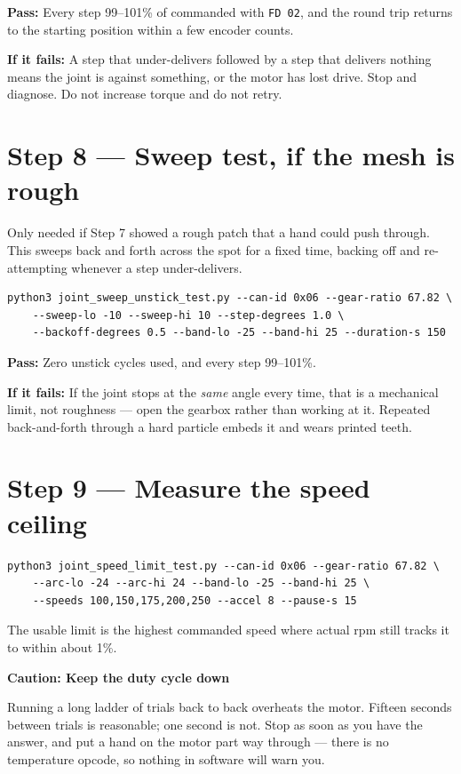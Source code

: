 \documentclass[11pt,letterpaper]{article}
\newenvironment{caution}[1]{%
    \par\addvspace{8pt}%
    \noindent{\color{cautionred}\rule{\linewidth}{0.8pt}}\par\vspace{2pt}
    \noindent\textbf{\color{cautionred}Caution: #1}\par\vspace{2pt}
}{%
    \par\vspace{2pt}\noindent{\color{cautionred}\rule{\linewidth}{0.4pt}}%
    \par\addvspace{8pt}%
}
\newcommand{\passif}[1]{\par\vspace{2pt}\noindent\textbf{\color{okgreen}Pass:} #1\par\vspace{4pt}}
\newcommand{\failif}[1]{\noindent\textbf{If it fails:} #1\par\vspace{6pt}}
\begin{document}
\passif{Every step 99--101\% of commanded with \texttt{FD 02}, and the round trip
returns to the starting position within a few encoder counts.}
\failif{A step that under-delivers followed by a step that delivers nothing means
the joint is against something, or the motor has lost drive. Stop and diagnose. Do
not increase torque and do not retry.}

\section*{Step 8 --- Sweep test, if the mesh is rough}

Only needed if Step 7 showed a rough patch that a hand could push through. This
sweeps back and forth across the spot for a fixed time, backing off and re-attempting
whenever a step under-delivers.

\begin{lstlisting}
python3 joint_sweep_unstick_test.py --can-id 0x06 --gear-ratio 67.82 \
    --sweep-lo -10 --sweep-hi 10 --step-degrees 1.0 \
    --backoff-degrees 0.5 --band-lo -25 --band-hi 25 --duration-s 150
\end{lstlisting}

\passif{Zero unstick cycles used, and every step 99--101\%.}
\failif{If the joint stops at the \emph{same} angle every time, that is a mechanical
limit, not roughness --- open the gearbox rather than working at it. Repeated
back-and-forth through a hard particle embeds it and wears printed teeth.}

\section*{Step 9 --- Measure the speed ceiling}

\begin{lstlisting}
python3 joint_speed_limit_test.py --can-id 0x06 --gear-ratio 67.82 \
    --arc-lo -24 --arc-hi 24 --band-lo -25 --band-hi 25 \
    --speeds 100,150,175,200,250 --accel 8 --pause-s 15
\end{lstlisting}

The usable limit is the highest commanded speed where actual rpm still tracks it to
within about 1\%.

\begin{caution}{Keep the duty cycle down}
Running a long ladder of trials back to back overheats the motor. Fifteen seconds
between trials is reasonable; one second is not. Stop as soon as you have the
answer, and put a hand on the motor part way through --- there is no temperature
opcode, so nothing in software will warn you.
\end{caution}
\end{document}
